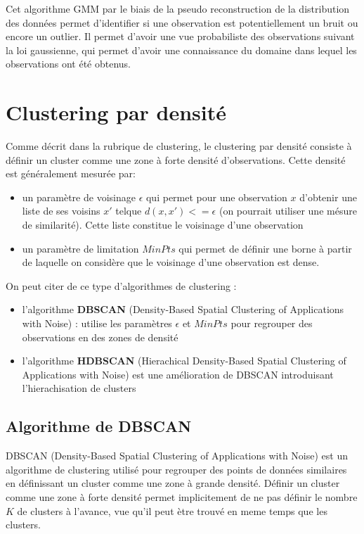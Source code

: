 \documentclass[12pt, french, latin.medieval, a4paper]{report}
\begin{document}
            Cet algorithme GMM par le biais de la pseudo reconstruction de la distribution des données permet d'identifier si une observation est potentiellement un bruit ou encore un outlier. Il permet d'avoir une vue probabiliste des observations suivant la loi gaussienne, qui permet d'avoir une connaissance du domaine dans lequel les observations ont été obtenus.
        
            
    \section{Clustering par densité}
        Comme décrit dans la rubrique de clustering, le clustering par densité consiste à définir un cluster comme une zone à forte densité d'observations. Cette densité est généralement mesurée par:
        
        \begin{itemize}
            \item un paramètre de voisinage $\epsilon$ qui permet pour une observation $x$ d'obtenir une liste de ses voisins $x'$ telque $d(x, x') <= \epsilon$ (on pourrait utiliser une mésure de similarité). Cette liste constitue le voisinage d'une observation
            \item un paramètre de limitation $MinPts$ qui permet de définir une borne à partir de laquelle on considère que le voisinage d'une observation est dense.
        \end{itemize}  
        On peut citer de ce type d'algorithmes de clustering :
        \begin{itemize}
            \item l'algorithme \textbf{DBSCAN} (Density-Based Spatial Clustering of Applications with Noise) : utilise les paramètres $\epsilon$ et $MinPts$ pour regrouper des observations en des zones de densité
            \item l'algorithme \textbf{HDBSCAN} (Hierachical Density-Based Spatial Clustering of Applications with Noise) est une amélioration de DBSCAN introduisant l'hierachisation de clusters 
        \end{itemize}

        \subsection{Algorithme de DBSCAN}
            DBSCAN (Density-Based Spatial Clustering of Applications with Noise) \cite{khan2014dbscan} est un algorithme de clustering utilisé pour regrouper des points de données similaires en définissant un cluster comme une zone à grande densité. Définir un cluster comme une zone à forte densité permet implicitement de ne pas définir le nombre $K$ de clusters à l'avance, vue qu'il peut ètre trouvé en meme temps que les clusters.
    
\end{document}
